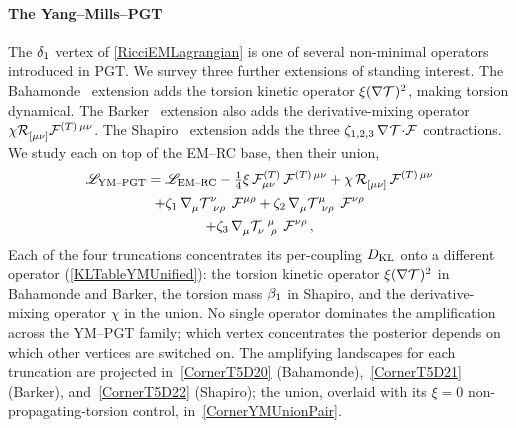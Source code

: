 \paragraph*{The Yang--Mills--PGT}
\label{YangMillsPGT}
The $\delta_{1}$ vertex of \cref{RicciEMLagrangian} is one of several
non-minimal operators introduced in PGT. We survey three further
extensions of standing interest. The
Bahamonde~\cite{bahamonde2025torsion} extension adds the torsion
kinetic operator $\xi(\nabla\MAGT{})^2$, making torsion dynamical.
The Barker~\cite{barker2024poincare} extension also adds the
derivative-mixing operator $\chi\MAGF{_{[\mu\nu]}}\mathcal{F}^{(T)\,\mu\nu}$.
The Shapiro~\cite{shapiro2002torsion} extension adds the three
$\zeta_{1,2,3}\,\rcD{}\MAGT{}{\cdot}\FieldF{}$ contractions. We
study each on top of the EM--RC base, then their union,
\begin{multline}
  \lag_\text{YM--PGT}
    = \lag_\text{EM--RC}
      - \tfrac{1}{4}\xi\,
              \mathcal{F}^{(T)}_{\mu\nu}\,
              \mathcal{F}^{(T)\,\mu\nu}
    + \chi\,\MAGF{_{[\mu\nu]}}\,
              \mathcal{F}^{(T)\,\mu\nu} \\
    + \zeta_1\,\rcD{_\mu}\MAGT{^{\nu}_{\nu\rho}}\,
              \FieldF{^{\mu\rho}}
    + \zeta_2\,\rcD{_\mu}\MAGT{^{\mu}_{\nu\rho}}\,
              \FieldF{^{\nu\rho}} \\
    + \zeta_3\,\rcD{_\mu}\MAGT{_{\nu}^{\mu}_{\rho}}\,
              \FieldF{^{\nu\rho}} \, ,
  \label{NonMinimalLagrangian}
\end{multline}
Each of the four truncations concentrates its per-coupling $D_\mathrm{KL}$
onto a different operator (\cref{KLTableYMUnified}): the torsion
kinetic operator $\xi(\nabla\MAGT{})^2$ in Bahamonde and Barker, the
torsion mass $\beta_{1}$ in Shapiro, and the derivative-mixing
operator $\chi$ in the union. No single operator dominates the
amplification across the YM--PGT family; which vertex concentrates
the posterior depends on which other vertices are switched on.
The amplifying landscapes for each truncation are projected
in~\cref{CornerT5D20} (Bahamonde),~\cref{CornerT5D21} (Barker),
and~\cref{CornerT5D22} (Shapiro); the union, overlaid with its
$\xi=0$ non-propagating-torsion control, in~\cref{CornerYMUnionPair}.

